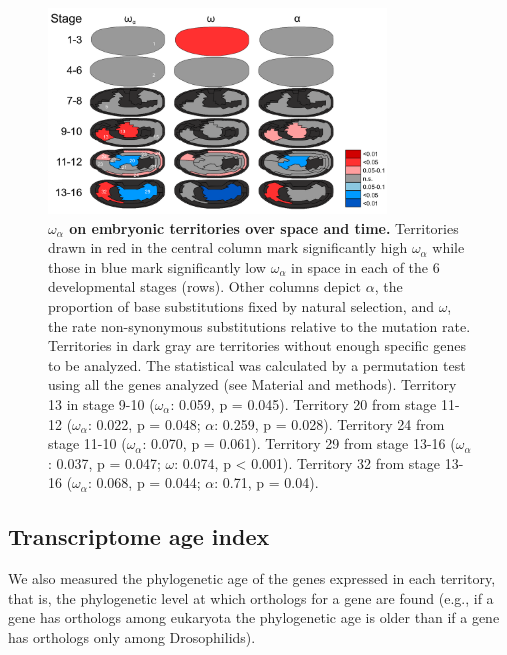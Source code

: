 \begin{figure}[h]
  \includegraphics[width=0.8\textwidth]{./Images/Art-III/OmegaA_territories.png}
  \centering
  \caption{\textbf{$\omega_{\alpha}$ on embryonic territories over space and time.}
   Territories drawn in red in the central column mark significantly high $\omega_{\alpha}$ while those in blue mark significantly low $\omega_{\alpha}$ in space in each of the 6 developmental stages (rows). Other columns depict $\alpha$, the proportion of base substitutions fixed by natural selection, and $\omega$, the rate non-synonymous substitutions relative to the mutation rate. 
  Territories in dark gray are territories without enough specific genes to be analyzed. The statistical was calculated by a permutation test using all the genes analyzed (see Material and methods). Territory 13 in stage 9-10 ($\omega_{\alpha}$: 0.059, p = 0.045). Territory 20 from stage 11-12 ($\omega_{\alpha}$: 0.022, p = 0.048; $\alpha$: 0.259, p = 0.028). Territory 24 from stage 11-10 ($\omega_{\alpha}$: 0.070, p = 0.061). Territory 29 from stage 13-16 ($\omega_{\alpha}$: 0.037, p = 0.047; $\omega$: 0.074, p < 0.001). Territory 32 from stage 13-16 ($\omega_{\alpha}$: 0.068, p = 0.044; $\alpha$: 0.71, p = 0.04).
  }
  \label{fig:Art-III-OmegaA_territories}
\end{figure}


\subsection{Transcriptome age index}

We also measured the phylogenetic age \citep{Drost2015} of the genes expressed in each territory, that is, the phylogenetic level at which orthologs for a gene are found (e.g., if a gene has orthologs among eukaryota the phylogenetic age is older than if a gene has orthologs only among Drosophilids). 

